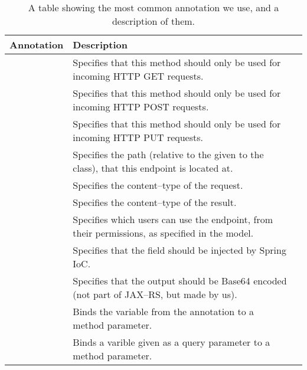 \begin{table}[ht]
    \centering     
    \small
    \begin{tabu} to \textwidth{lXl}
        Annotation & Description \\ \midrule
         & Specifies that this method should only be used for incoming HTTP GET requests. \\
         & Specifies that this method should only be used for incoming HTTP POST requests. \\
         & Specifies that this method should only be used for incoming HTTP PUT requests. \\
         & Specifies the path (relative to the  given to the class), that this endpoint is located at. \\
         & Specifies the content--type of the request. \\
         & Specifies the content--type of the result. \\
         & Specifies which users can use the endpoint, from their permissions, as specified in the model. \\
         & Specifies that the field should be injected by Spring IoC. \\
         & Specifies that the output should be Base64 encoded (not part of JAX--RS, but made by us). \\
         & Binds the variable from the  annotation to a method parameter. \\
         & Binds a varible given as a query parameter to a method parameter. \\
    \end{tabu}
    \caption{A table showing the most common annotation we use, and a description of them.}\label{table:serviceannotations}
\end{table}
